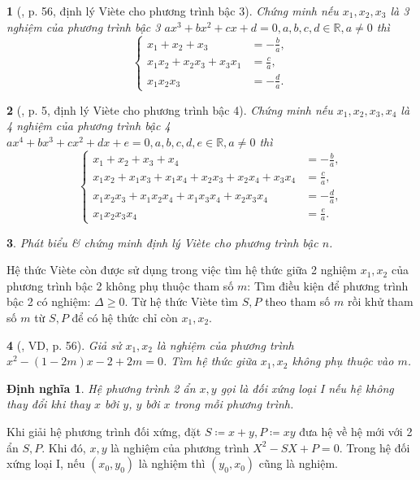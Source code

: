 \documentclass{article}
\newtheorem{baitoan}{}
\newtheorem{dinhnghia}{Định nghĩa}
\begin{document}
\begin{baitoan}[\cite{Binh_boi_duong_Toan_9_tap_2}, p. 56, định lý Vi\`ete cho phương trình bậc 3]
	Chứng minh nếu $x_1,x_2,x_3$ là 3 nghiệm của phương trình bậc 3 $ax^3 + bx^2 + cx + d = 0,a,b,c,d\in\mathbb{R},a\ne0$ thì
	\begin{equation*}
		\left\{\begin{split}
			x_1 + x_2 + x_3 &= -\frac{b}{a},\\
			x_1x_2 + x_2x_3 + x_3x_1 &= \frac{c}{a},\\
			x_1x_2x_3 &= -\frac{d}{a}.
		\end{split}\right.
	\end{equation*}
\end{baitoan}

\begin{baitoan}[\cite{Binh_boi_duong_Toan_9_tap_2}, p. 5, định lý Vi\`ete cho phương trình bậc 4]
	Chứng minh nếu $x_1,x_2,x_3,x_4$ là 4 nghiệm của phương trình bậc 4 $ax^4 + bx^3 + cx^2 + dx + e = 0,a,b,c,d,e\in\mathbb{R},a\ne0$ thì
	\begin{equation*}
		\left\{\begin{split}
			x_1 + x_2 + x_3 + x_4 &= -\frac{b}{a},\\
			x_1x_2 + x_1x_3 + x_1x_4 + x_2x_3 + x_2x_4 + x_3x_4 &= \frac{c}{a},\\
			x_1x_2x_3 + x_1x_2x_4 + x_1x_3x_4 + x_2x_3x_4 &= -\frac{d}{a},\\
			x_1x_2x_3x_4 &= \frac{e}{a}.
		\end{split}\right.
	\end{equation*}
\end{baitoan}

\begin{baitoan}
	Phát biểu \& chứng minh định lý Vi\`ete cho phương trình bậc $n$.
\end{baitoan}
Hệ thức Vi\`ete còn được sử dụng trong việc tìm hệ thức giữa 2 nghiệm $x_1,x_2$ của phương trình bậc 2 không phụ thuộc tham số $m$: Tìm điều kiện để phương trình bậc 2 có nghiệm: $\Delta\ge0$. Từ hệ thức Vi\`ete tìm $S,P$ theo tham số $m$ rồi khử tham số $m$ từ $S,P$ để có hệ thức chỉ còn $x_1,x_2$.

\begin{baitoan}[\cite{Binh_boi_duong_Toan_9_tap_2}, VD, p. 56]
	Giả sử $x_1,x_2$ là nghiệm của phương trình $x^2 - (1 - 2m)x - 2 + 2m = 0$. Tìm hệ thức giữa $x_1,x_2$ không phụ thuộc vào $m$.
\end{baitoan}

\begin{dinhnghia}
	Hệ phương trình 2 ẩn $x,y$ gọi là {đối xứng loại I} nếu hệ không thay đổi khi thay $x$ bởi $y$, $y$ bởi $x$ trong mỗi phương trình.
\end{dinhnghia}
Khi giải hệ phương trình đối xứng, đặt $S\coloneqq x + y,P\coloneqq xy$ đưa hệ về hệ mới với 2 ẩn $S,P$. Khi đó, $x,y$ là nghiệm của phương trình $X^2 - SX + P = 0$. Trong hệ đối xứng loại I, nếu $(x_0,y_0)$ là nghiệm  thì $(y_0,x_0)$ cũng là nghiệm.
\end{document}
